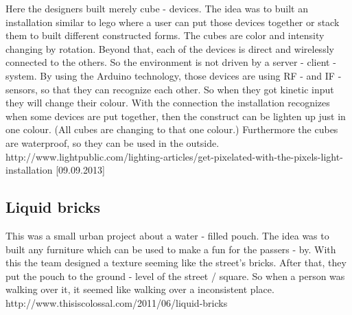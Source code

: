 Here the designers built merely cube - devices. \newline
The idea was to built an installation similar to lego \texttrademark where a user can put those devices together or stack them to built different constructed forms. \newline
The cubes are color and intensity changing by rotation. Beyond that, each of the devices is direct and wirelessly connected to the others. So the environment is not driven by a server - client - system.\newline
By using the Arduino technology, those devices are using RF - and IF - sensors, so that they can recognize each other. So when they got kinetic input they will change their colour. With the connection the installation recognizes when some devices are put together, then the construct can be lighten up just in one colour. (All cubes are changing to that one colour.)\newline
 Furthermore the cubes are waterproof, so they can be used in the outside.\newline
\newline
http://www.lightpublic.com/lighting-articles/get-pixelated-with-the-pixels-light-installation [09.09.2013] \newline

\subsection{Liquid bricks}

 
This was a small urban project about a water - filled pouch. \newline
The idea was to built any furniture which can be used to make a fun for the passers - by. With this the team designed a texture seeming like the street's bricks. After that, they put the pouch to the ground - level of the street / square. So when a person was walking over it, it seemed like walking over a inconsistent place.\newline
\newline
http://www.thisiscolossal.com/2011/06/liquid-bricks\newline


